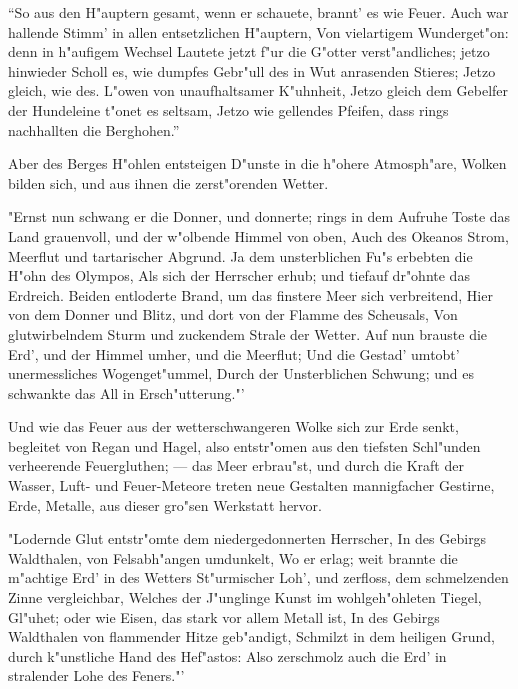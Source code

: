 \documentclass[a4paper, 11pt, oneside, polutonikogreek, german]{article}
\begin{document}
"`So aus den H"auptern gesamt, wenn er schauete, brannt' es wie Feuer. Auch war hallende Stimm' in allen entsetzlichen H"auptern, Von vielartigem Wunderget"on: denn in h"aufigem Wechsel Lautete jetzt f"ur die G"otter verst"andliches; jetzo hinwieder Scholl es, wie dumpfes Gebr"ull des in Wut anrasenden Stieres; Jetzo gleich, wie des. L"owen von unaufhaltsamer K"uhnheit, Jetzo gleich dem Gebelfer der Hundeleine t"onet es seltsam, Jetzo wie gellendes Pfeifen, dass rings nachhallten die Berghohen."'

Aber des Berges H"ohlen entsteigen D"unste in die h"ohere Atmosph"are, Wolken bilden sich, und aus ihnen die zerst"orenden Wetter.

"Ernst nun schwang er die Donner, und donnerte; rings in dem Aufruhe Toste das Land grauenvoll, und der w"olbende Himmel von oben, Auch des Okeanos Strom, Meerflut und tartarischer Abgrund. Ja dem unsterblichen Fu"s erbebten die H"ohn des Olympos, Als sich der Herrscher erhub; und tiefauf dr"ohnte das Erdreich. Beiden entloderte Brand, um das finstere Meer sich verbreitend, Hier von dem Donner und Blitz, und dort von der Flamme des Scheusals, Von glutwirbelndem Sturm und zuckendem Strale der Wetter. Auf nun brauste die Erd', und der Himmel umher, und die Meerflut; Und die Gestad' umtobt' unermessliches Wogenget"ummel, Durch der Unsterblichen Schwung; und es schwankte das All in Ersch"utterung."'

Und wie das Feuer aus der wetterschwangeren Wolke sich zur Erde senkt, begleitet von Regan und Hagel, also entstr"omen aus den tiefsten Schl"unden verheerende Feuergluthen; --- das Meer erbrau"st, und durch die Kraft der Wasser, Luft- und Feuer-Meteore treten neue Gestalten mannigfacher Gestirne, Erde, Metalle, aus dieser gro"sen Werkstatt hervor.

"Lodernde Glut entstr"omte dem niedergedonnerten Herrscher, In des Gebirgs Waldthalen, von Felsabh"angen umdunkelt, Wo er erlag; weit brannte die m"achtige Erd' in des Wetters St"urmischer Loh', und zerfloss, dem schmelzenden Zinne vergleichbar, Welches der J"unglinge Kunst im wohlgeh"ohleten Tiegel, Gl"uhet; oder wie Eisen, das stark vor allem Metall ist, In des Gebirgs Waldthalen von flammender Hitze geb"andigt, Schmilzt in dem heiligen Grund, durch k"unstliche Hand des Hef"astos: Also zerschmolz auch die Erd' in stralender Lohe des Feners."'
\end{document}
